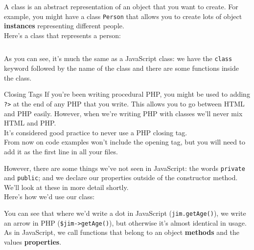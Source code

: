 A class is an abstract representation of an object that you want to create. For example, you might have a class \texttt{Person} that allows you to create lots of object \textbf{instances} representing different people.
\\

Here's a class that represents a person:

\inputminted{php}{01/figures/01/01-class.php}

As you can see, it's much the same as a JavaScript class: we have the \texttt{class} keyword followed by the name of the class and there are some functions inside the class.

\begin{infobox}{Closing Tags}
    If you're been writing procedural PHP, you might be used to adding \texttt{?>} at the end of any PHP that you write. This allows you to go between HTML and PHP easily. However, when we're writing PHP with classes we'll never mix HTML and PHP.
    \\

    It's considered good practice to never use a PHP closing tag.
    \\

    From now on code examples won't include the opening tag, but you will need to add it as the first line in all your files.
\end{infobox}


However, there are some things we've not seen in JavaScript: the words \texttt{private} and \texttt{public}; and we declare our properties outside of the constructor method. We'll look at these in more detail shortly.
\\

Here's how we'd use our class:


You can see that where we'd write a dot in JavaScript (\texttt{jim.getAge()}), we write an arrow in PHP (\texttt{\$jim->getAge()}), but otherwise it's almost identical in usage.
\\

As in JavaScript, we call functions that belong to an object \textbf{methods} and the values \textbf{properties}.

